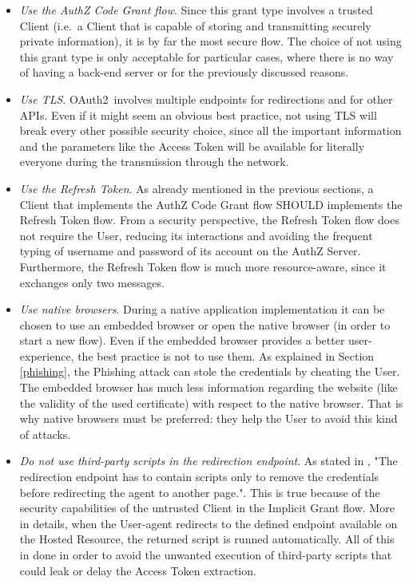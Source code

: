 \documentclass[a4paper,12pt]{article}
\def\ie{i.e.\xspace}
\def\oauth{OAuth2\xspace}
\begin{document}
\begin{itemize}
    \item \textit{Use the AuthZ Code Grant flow}. Since this grant type involves a trusted Client (\ie\ a Client that is capable of storing and transmitting securely private information), it is by far the most secure flow. The choice of not using this grant type is only acceptable for particular cases, where there is no way of having a back-end server or for the previously discussed reasons.
    \item \textit{Use TLS}. \oauth\ involves multiple endpoints for redirections and for other APIs. Even if it might seem an obvious best practice, not using TLS will break every other possible security choice, since all the important information and the parameters like the Access Token will be available for literally everyone during the transmission through the network.
    \item \textit{Use the Refresh Token}. As already mentioned in the previous sections, a Client that implements the AuthZ Code Grant flow SHOULD implements the Refresh Token flow. From a security perspective, the Refresh Token flow does not require the User, reducing its interactions and avoiding the frequent typing of username and password of its account on the AuthZ Server. Furthermore, the Refresh Token flow is much more resource-aware, since it exchanges only two messages.
    \item \textit{Use native browsers}. \label{native} During a native application implementation it can be chosen to use an embedded browser or open the native browser (in order to start a new flow). Even if the embedded browser provides a better user-experience, the best practice is not to use them. As explained in Section \ref{phishing}, the Phishing attack can stole the credentials by cheating the User. The embedded browser has much less information regarding the website (like the validity of the used certificate) with respect to the native browser. That is why native browsers must be preferred: they help the User to avoid this kind of attacks.
    \item \textit{Do not use third-party scripts in the redirection endpoint}. As stated in \cite{mastering}, "The redirection endpoint has to contain scripts only to remove the credentials before redirecting the agent to another page.". This is true because of the security capabilities of the untrusted Client in the Implicit Grant flow. More in details, when the User-agent redirects to the defined endpoint available on the Hosted Resource, the returned script is runned automatically. All of this in done in order to avoid the unwanted execution of third-party scripts that could leak or delay the Access Token extraction.

\end{itemize}
\end{document}
